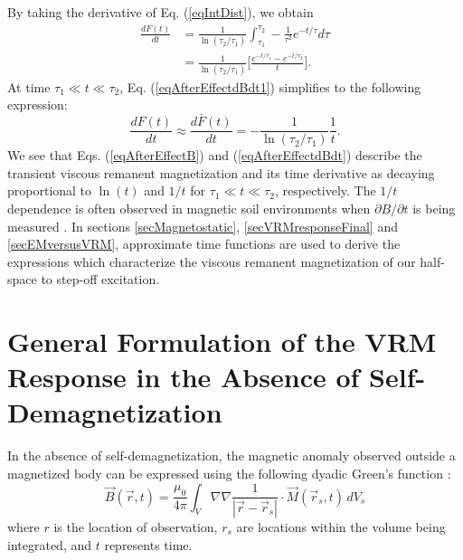 \documentclass[onecolumn]{IEEEtran} %
\begin{document}
By taking the derivative of Eq. (\ref{eqIntDist}), we obtain
\begin{align}
\label{eqAfterEffectdBdt1}
\frac{d F(t)}{dt} &= \frac{1}{\ln(\tau_2/\tau_1)} \int^{\tau_2}_{\tau_1} - \frac{1}{\tau^2} e^{-t/\tau} d \tau \nonumber \\
& = \frac{1}{\ln(\tau_2/\tau_1)} \Bigg [ \frac{e^{-t/\tau_1} -e^{-t/\tau_2} }{t} \Bigg ].
\end{align}
At time $\tau_1 \ll t \ll \tau_2$, Eq. (\ref{eqAfterEffectdBdt1}) simplifies to the following expression:
\begin{equation}
\label{eqAfterEffectdBdt}
\frac{dF(t)}{d t} \approx \frac{d \bar F(t)}{d t} = -\frac{1}{\ln(\tau_2/\tau_1)} \frac{1}{t}.
\end{equation}
We see that Eqs. (\ref{eqAfterEffectB}) and (\ref{eqAfterEffectdBdt}) describe the transient viscous remanent magnetization and its time derivative as decaying proportional to $\ln(t)$ and $1/t$ for $\tau_1 \ll t \ll \tau_2$, respectively. The $1/t$ dependence is often observed in magnetic soil environments when $\partial B/\partial t$ is being measured \cite{Dabas1992,Buselli1982,Pasion2007}. In sections \ref{secMagnetostatic}, \ref{secVRMresponseFinal} and \ref{secEMversusVRM}, approximate time functions are used to derive the expressions which characterize the viscous remanent magnetization of our half-space to step-off excitation.




\section{General Formulation of the VRM Response in the Absence of Self-Demagnetization}
\label{secSelfDemag}

In the absence of self-demagnetization,  the magnetic anomaly observed outside a magnetized body can be expressed using the following dyadic Green's function \citep{Blakely1996}:
\begin{equation}
\vec B(\vec r,t) = \frac{\mu_0}{4 \pi} \int_{V} \nabla \nabla \frac{1}{| \vec r - \vec r_s |} \cdot \vec M(\vec r_s, t) \, dV_s
\label{Bfield}
\end{equation}
where $r$ is the location of observation, $r_s$ are locations within the volume being integrated, and $t$ represents time.
\\
\end{document}
